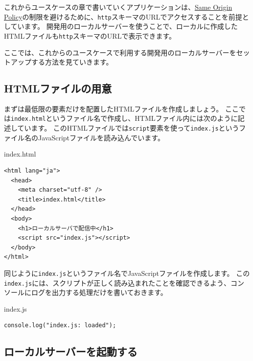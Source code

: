 これからユースケースの章で書いていくアプリケーションは、\href{https://developer.mozilla.org/ja/docs/Web/Security/Same-origin_policy}{Same Origin
Policy}の制限を避けるために、\texttt{http}スキーマのURLでアクセスすることを前提としています。
開発用のローカルサーバーを使うことで、ローカルに作成したHTMLファイルも\texttt{http}スキーマのURLで表示できます。

ここでは、これからのユースケースで利用する開発用のローカルサーバーをセットアップする方法を見ていきます。

\hypertarget{preparing-html}{%
\subsection{HTMLファイルの用意}\label{preparing-html}}

まずは最低限の要素だけを配置したHTMLファイルを作成しましょう。
ここでは\texttt{index.html}というファイル名で作成し、HTMLファイル内には次のように記述しています。
このHTMLファイルでは\texttt{script}要素を使って\texttt{index.js}というファイル名のJavaScriptファイルを読み込んでいます。

\begin{listtitle}
index.html
\end{listtitle}
\begin{lstlisting}
<html lang="ja">
  <head>
    <meta charset="utf-8" />
    <title>index.html</title>
  </head>
  <body>
    <h1>ローカルサーバで配信中</h1>
    <script src="index.js"></script>
  </body>
</html>
\end{lstlisting}
\listend

同じように\texttt{index.js}というファイル名でJavaScriptファイルを作成します。
この\texttt{index.js}には、スクリプトが正しく読み込まれたことを確認できるよう、コンソールにログを出力する処理だけを書いておきます。

\begin{listtitle}
index.js
\end{listtitle}
\begin{lstlisting}
console.log("index.js: loaded");
\end{lstlisting}
\listend

\hypertarget{open-js-primer-local-server}{%
\subsection{ローカルサーバーを起動する}\label{open-js-primer-local-server}}


